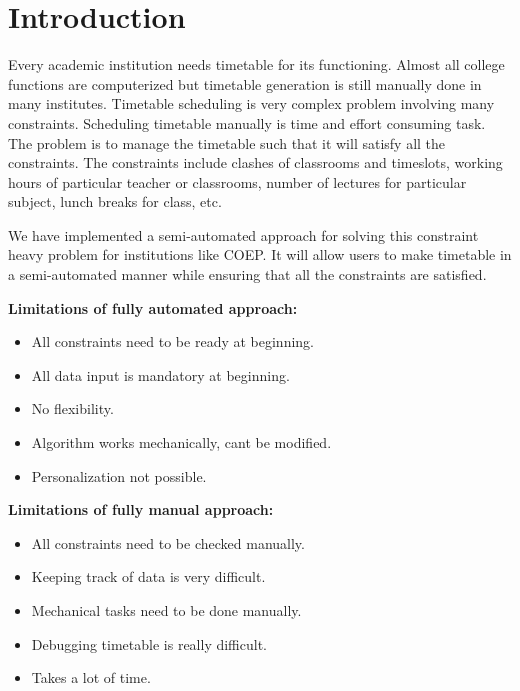 %

\chapter{Introduction}
Every academic institution needs timetable for its functioning. Almost all college functions are computerized but timetable generation is still manually done in many institutes. Timetable scheduling is very complex problem involving many constraints. Scheduling timetable manually is time and effort consuming task. The problem is to manage the timetable such that it will satisfy all the constraints. The constraints include clashes of classrooms and timeslots, working hours of particular teacher or classrooms, number of lectures for particular subject, lunch breaks for class, etc.

We have implemented a semi-automated approach for solving this constraint heavy problem for institutions like COEP. It will allow users to make timetable  in a semi-automated manner while ensuring that all the constraints are satisfied.

{\bfseries Limitations of fully automated approach:}
\begin{itemize}
\item All constraints need to be ready at beginning.
\item All data input is mandatory at beginning. 
\item No flexibility.
\item Algorithm works mechanically, cant be modified.
\item Personalization not possible.
\end{itemize}

{\bfseries Limitations of fully manual approach:}
\begin{itemize}
\item All constraints need to be checked manually.
\item Keeping track of data is very difficult.
\item Mechanical tasks need to be done manually.
\item Debugging timetable is really difficult.
\item Takes a lot of time.
\end{itemize}

